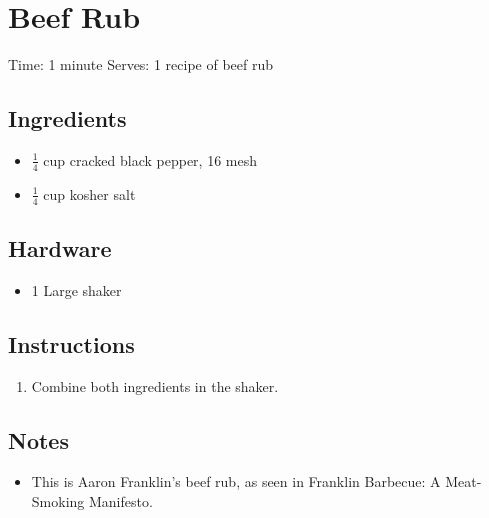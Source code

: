 \section{Beef Rub}
\label{beefRub}
\setcounter{secnumdepth}{0}
Time: 1 minute
Serves: 1 recipe of beef rub

\begin{multicols}{2}
\subsection*{Ingredients}
\begin{itemize}
    \item \( \frac{1}{4} \) cup cracked black pepper, 16 mesh
    \item \( \frac{1}{4} \) cup kosher salt
\end{itemize}

\subsection*{Hardware}
\begin{itemize}
    \item 1 Large shaker
\end{itemize}
\clearpage

\subsection*{Instructions}
\begin{enumerate}
    \item Combine both ingredients in the shaker.
\end{enumerate}

\subsection*{Notes}
\begin{itemize}
    \item This is Aaron Franklin's beef rub, as seen in Franklin Barbecue: A Meat-Smoking Manifesto.
\end{itemize}
\end{multicols}
\clearpage